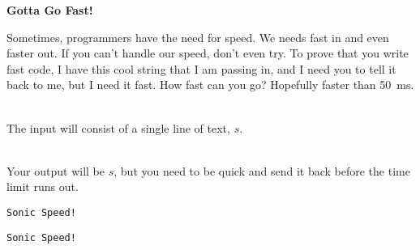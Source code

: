 \documentclass[12pt]{article}
\begin{document}
\begin{center}
   \Large\textbf{Gotta Go Fast!}
\end{center}

Sometimes, programmers have the need for speed. We needs fast in and even faster out. If you can't handle our speed, don't even try. To prove that you write fast code, I have this cool string that I am passing in, and I need you to tell it back to me, but I need it fast. How fast can you go? Hopefully faster than \SI{50}{\milli\second}.

\vspace*{.3in} \\

The input will consist of a single line of text, \(s\).

\vspace*{.3in} \\

Your output will be \(s\), but you need to be quick and send it back before the time limit runs out.

\vspace*{.3in} 
\begin{verbatim}
Sonic Speed!
\end{verbatim}

\vspace*{.3in} 
\begin{verbatim}
Sonic Speed!
\end{verbatim}
\end{document}
